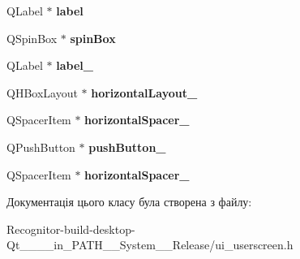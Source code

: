 \begin{DoxyCompactItemize}
\item 
\hypertarget{classUi__UserScreen_a347ce540d2d8f696034930de9b855871}{Q\-Label $\ast$ {\bfseries label}}\label{classUi__UserScreen_a347ce540d2d8f696034930de9b855871}

\item 
\hypertarget{classUi__UserScreen_ab9c87b68ab681f8fd93308388326ec46}{Q\-Spin\-Box $\ast$ {\bfseries spin\-Box}}\label{classUi__UserScreen_ab9c87b68ab681f8fd93308388326ec46}

\item 
\hypertarget{classUi__UserScreen_aaabb2e38aa9dd9f8423c8f3ebb006a45}{Q\-Label $\ast$ {\bfseries label\-\_}}\label{classUi__UserScreen_aaabb2e38aa9dd9f8423c8f3ebb006a45}

\item 
\hypertarget{classUi__UserScreen_aef7d0fc7c218aef9ca175866623baa56}{Q\-H\-Box\-Layout $\ast$ {\bfseries horizontal\-Layout\-\_}}\label{classUi__UserScreen_aef7d0fc7c218aef9ca175866623baa56}

\item 
\hypertarget{classUi__UserScreen_ab4d144e9a9a2972c2d45932a3ee8a83b}{Q\-Spacer\-Item $\ast$ {\bfseries horizontal\-Spacer\-\_}}\label{classUi__UserScreen_ab4d144e9a9a2972c2d45932a3ee8a83b}

\item 
\hypertarget{classUi__UserScreen_a39eb49834a06b67ee65f0bd766dd2cb1}{Q\-Push\-Button $\ast$ {\bfseries push\-Button\-\_}}\label{classUi__UserScreen_a39eb49834a06b67ee65f0bd766dd2cb1}

\item 
\hypertarget{classUi__UserScreen_abb897305929d863ab890b16849e5156d}{Q\-Spacer\-Item $\ast$ {\bfseries horizontal\-Spacer\-\_}}\label{classUi__UserScreen_abb897305929d863ab890b16849e5156d}

\end{DoxyCompactItemize}


Документація цього класу була створена з файлу\-:\begin{DoxyCompactItemize}
\item 
Recognitor-\/build-\/desktop-\/\-Qt\-\_\-\_\-\_\-\_\-in\-\_\-\-P\-A\-T\-H\-\_\-\-\_\-\-System\-\_\-\-\_\-\-Release/ui\-\_\-userscreen.\-h\end{DoxyCompactItemize}
